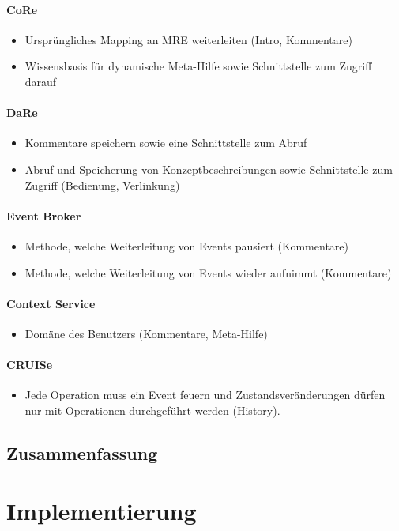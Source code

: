 \documentclass[
	headsepline,
	footsepline,
	fontsize=12pt,
	bibliography=totoc
]{scrbook}
\begin{document}
\subsubsection{CoRe}

\begin{itemize}
	\item Ursprüngliches Mapping an MRE weiterleiten (Intro, Kommentare)
	\item Wissensbasis für dynamische Meta-Hilfe sowie Schnittstelle zum Zugriff darauf
\end{itemize}

\subsubsection{DaRe}

\begin{itemize}
	\item Kommentare speichern sowie eine Schnittstelle zum Abruf
	\item Abruf und Speicherung von Konzeptbeschreibungen sowie Schnittstelle zum Zugriff (Bedienung, Verlinkung)
\end{itemize}

\subsubsection{Event Broker}

\begin{itemize}
	\item Methode, welche Weiterleitung von Events pausiert (Kommentare)
	\item Methode, welche Weiterleitung von Events wieder aufnimmt (Kommentare)
\end{itemize}

\subsubsection{Context Service}

\begin{itemize}
	\item Domäne des Benutzers (Kommentare, Meta-Hilfe)
\end{itemize}

\subsubsection{CRUISe}

\begin{itemize}
	\item Jede Operation muss ein Event feuern und Zustandsveränderungen dürfen nur mit Operationen durchgeführt werden (History).
\end{itemize}

\section{Zusammenfassung}
\label{section:konzeption:zusammenfassung}

\chapter{Implementierung}
\label{chapter:implementierung}

\printbibliography[title=Literaturverzeichnis]

\end{document}
